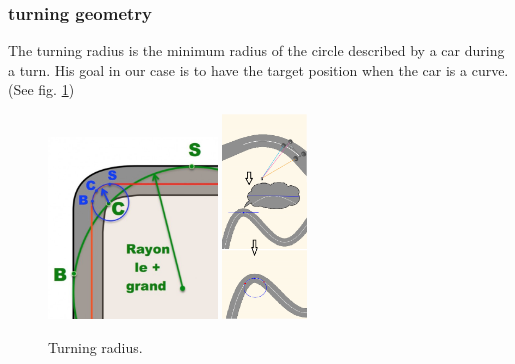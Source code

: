 \documentclass{llncs}
\begin{document}
\subsubsection{turning geometry}
The turning radius is the minimum radius of the circle described by a car during a turn. His goal in our case is to have the target position when the car is a curve. (See fig. \ref {fig09})
\begin{figure}[h!]
	
	\centering
	\includegraphics[width=0.4\textwidth]{fig/rayon.png}
	\includegraphics[width=0.2\textwidth]{fig/06.png}
	
	
	
	\begin{minipage}{10cm}
		\centering
		\caption{\footnotesize Turning radius.}
		\label{fig09}
	\end{minipage} 
\end{figure}
\end{document}
